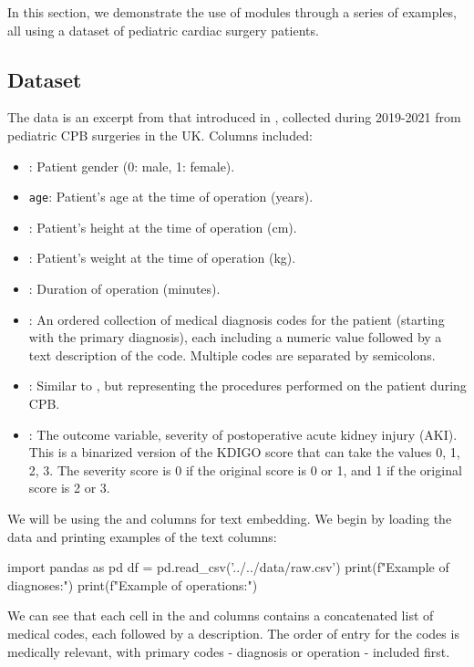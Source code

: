 \documentclass[article]{jss}
\begin{document}
In this section, we demonstrate the use of  modules through a series of examples, all using a dataset of pediatric cardiac surgery patients.

\subsection{Dataset}\label{subsec:using-dataset}

The data is an excerpt from that introduced in \cite{sharabiani2024genai}, collected during 2019-2021 from pediatric CPB surgeries in the UK. Columns included:
\begin{itemize}
  \item {}: Patient gender (0: male, 1: female).
  \item \texttt{age}: Patient's age at the time of operation (years).
  \item {}: Patient's height at the time of operation (cm).
  \item {}: Patient's weight at the time of operation (kg).
  \item {}: Duration of operation (minutes).
  \item {}: An ordered collection of medical diagnosis codes for the patient (starting with the primary diagnosis), each including a numeric value followed by a text description of the code. Multiple codes are separated by semicolons.
  \item {}: Similar to , but representing the procedures performed on the patient during CPB.
  \item {}: The outcome variable, severity of postoperative acute kidney injury (AKI). This is a binarized version of the KDIGO score \citep{eknoyan2013kdigo} that can take the values 0, 1, 2, 3. The severity score is 0 if the original score is 0 or 1, and 1 if the original score is 2 or 3.
\end{itemize}
We will be using the  and  columns for text embedding. We begin by loading the data and printing examples of the text columns:
\begin{pyblock}
import pandas as pd
df = pd.read_csv('../../data/raw.csv')
print(f"Example of diagnoses:\n\n")
print(f"Example of operations:\n")
\end{pyblock}
\stdoutpythontex %

We can see that each cell in the  and  columns contains a concatenated list of medical codes, each followed by a description. The order of entry for the codes is medically relevant, with primary codes - diagnosis or operation - included first. %
\end{document}
